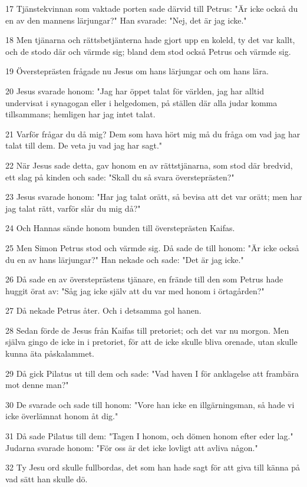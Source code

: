 \par 17 Tjänstekvinnan som vaktade porten sade därvid till Petrus: "Är icke också du en av den mannens lärjungar?" Han svarade: "Nej, det är jag icke."
\par 18 Men tjänarna och rättsbetjänterna hade gjort upp en koleld, ty det var kallt, och de stodo där och värmde sig; bland dem stod också Petrus och värmde sig.
\par 19 Översteprästen frågade nu Jesus om hans lärjungar och om hans lära.
\par 20 Jesus svarade honom: "Jag har öppet talat för världen, jag har alltid undervisat i synagogan eller i helgedomen, på ställen där alla judar komma tillsammans; hemligen har jag intet talat.
\par 21 Varför frågar du då mig? Dem som hava hört mig må du fråga om vad jag har talat till dem. De veta ju vad jag har sagt."
\par 22 När Jesus sade detta, gav honom en av rättstjänarna, som stod där bredvid, ett slag på kinden och sade: "Skall du så svara översteprästen?"
\par 23 Jesus svarade honom: "Har jag talat orätt, så bevisa att det var orätt; men har jag talat rätt, varför slår du mig då?"
\par 24 Och Hannas sände honom bunden till översteprästen Kaifas.
\par 25 Men Simon Petrus stod och värmde sig. Då sade de till honom: "Är icke också du en av hans lärjungar?" Han nekade och sade: "Det är jag icke."
\par 26 Då sade en av översteprästens tjänare, en frände till den som Petrus hade huggit örat av: "Såg jag icke själv att du var med honom i örtagården?"
\par 27 Då nekade Petrus åter. Och i detsamma gol hanen.
\par 28 Sedan förde de Jesus från Kaifas till pretoriet; och det var nu morgon. Men själva gingo de icke in i pretoriet, för att de icke skulle bliva orenade, utan skulle kunna äta påskalammet.
\par 29 Då gick Pilatus ut till dem och sade: "Vad haven I för anklagelse att frambära mot denne man?"
\par 30 De svarade och sade till honom: "Vore han icke en illgärningsman, så hade vi icke överlämnat honom åt dig."
\par 31 Då sade Pilatus till dem: "Tagen I honom, och dömen honom efter eder lag." Judarna svarade honom: "För oss är det icke lovligt att avliva någon."
\par 32 Ty Jesu ord skulle fullbordas, det som han hade sagt för att giva till känna på vad sätt han skulle dö.
